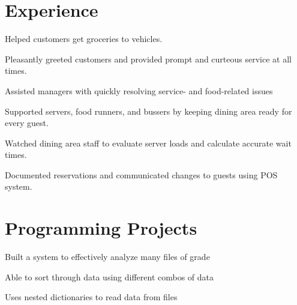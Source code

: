 \documentclass[]{deedy-resume-openfont}
\begin{document}
\begin{minipage}[t]{0.66\textwidth} 


\section{Experience}
\vspace{\topsep}
\begin{tightemize}
\item Helped customers get groceries to vehicles.
\item Pleasantly greeted customers and provided prompt and curteous service at all times.
\end{tightemize}
\sectionsep

\begin{tightemize}
\item Assisted managers with quickly resolving service- and food-related issues
\item Supported servers, food runners, and bussers by keeping dining area ready for every guest.
\end{tightemize}
\sectionsep

\begin{tightemize}
\item Watched dining area staff to evaluate server loads and calculate accurate wait times.
\item Documented reservations and communicated changes to guests using POS system.
\end{tightemize}
\sectionsep


\section{Programming Projects}
\begin{tightemize}
\item Built a system to effectively analyze many files of grade
\item Able to sort through data using different combos of data
\item Uses nested dictionaries to read data from files
\end{tightemize}  
\sectionsep


\end{minipage}
\end{document}
